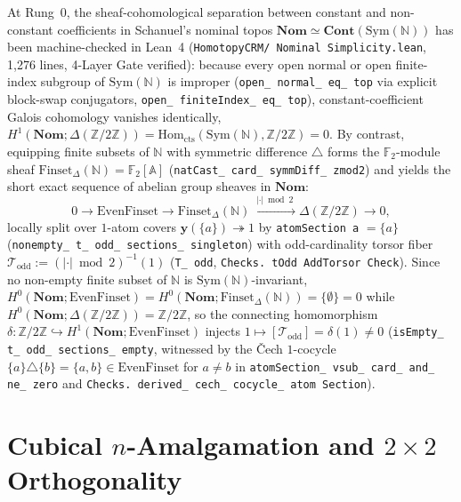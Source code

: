 At Rung~0, the sheaf-cohomological separation between constant and non-constant coefficients in Schanuel's nominal topos $\mathbf{Nom} \simeq \mathbf{Cont}(\mathrm{Sym}(\mathbb{N}))$ has been machine-checked in Lean~4 (\texttt{HomotopyCRM/ Nominal Simplicity.lean}, 1,276 lines, 4-Layer Gate verified): because every open normal or open finite-index subgroup of $\mathrm{Sym}(\mathbb{N})$ is improper (\texttt{open\_ normal\_ eq\_ top} via explicit block-swap conjugators, \texttt{open\_ finiteIndex\_ eq\_ top}), constant-coefficient Galois cohomology vanishes identically, $H^1(\mathbf{Nom}; \Delta(\mathbb{Z}/2\mathbb{Z})) = \mathrm{Hom}_{\mathrm{cts}}(\mathrm{Sym}(\mathbb{N}), \mathbb{Z}/2\mathbb{Z}) = 0$. By contrast, equipping finite subsets of $\mathbb{N}$ with symmetric difference $\triangle$ forms the $\mathbb{F}_2$-module sheaf $\mathrm{Finset}_\Delta(\mathbb{N}) = \mathbb{F}_2[\mathbb{A}]$ (\texttt{natCast\_ card\_ symmDiff\_ zmod2}) and yields the short exact sequence of abelian group sheaves in $\mathbf{Nom}$:
\[
  0 \longrightarrow \mathrm{EvenFinset} \longrightarrow \mathrm{Finset}_\Delta(\mathbb{N}) \xrightarrow{\;|\cdot|\bmod 2\;} \Delta(\mathbb{Z}/2\mathbb{Z}) \longrightarrow 0,
\]
locally split over $1$-atom covers $\mathbf{y}(\{a\}) \twoheadrightarrow 1$ by \texttt{atomSection a} $= \{a\}$ (\texttt{nonempty\_ t\_ odd\_ sections\_ singleton}) with odd-cardinality torsor fiber $\mathcal{T}_{\mathrm{odd}} := (|\cdot|\bmod 2)^{-1}(1)$ (\texttt{T\_ odd}, \texttt{Checks. tOdd AddTorsor Check}). Since no non-empty finite subset of $\mathbb{N}$ is $\mathrm{Sym}(\mathbb{N})$-invariant, $H^0(\mathbf{Nom}; \mathrm{EvenFinset}) = H^0(\mathbf{Nom}; \mathrm{Finset}_\Delta(\mathbb{N})) = \{\emptyset\} = 0$ while $H^0(\mathbf{Nom}; \Delta(\mathbb{Z}/2\mathbb{Z})) = \mathbb{Z}/2\mathbb{Z}$, so the connecting homomorphism $\delta : \mathbb{Z}/2\mathbb{Z} \hookrightarrow H^1(\mathbf{Nom}; \mathrm{EvenFinset})$ injects $1 \mapsto [\mathcal{T}_{\mathrm{odd}}] = \delta(1) \neq 0$ (\texttt{isEmpty\_ t\_ odd\_ sections\_ empty}, witnessed by the Čech $1$-cocycle $\{a\} \triangle \{b\} = \{a, b\} \in \mathrm{EvenFinset}$ for $a \neq b$ in \texttt{atomSection\_ vsub\_ card\_ and\_ ne\_ zero} and \texttt{Checks. derived\_ cech\_ cocycle\_ atom Section}).

\section{Cubical $n$-Amalgamation and $2 \times 2$ Orthogonality}\label{subsec:cubical-amalgamation}


